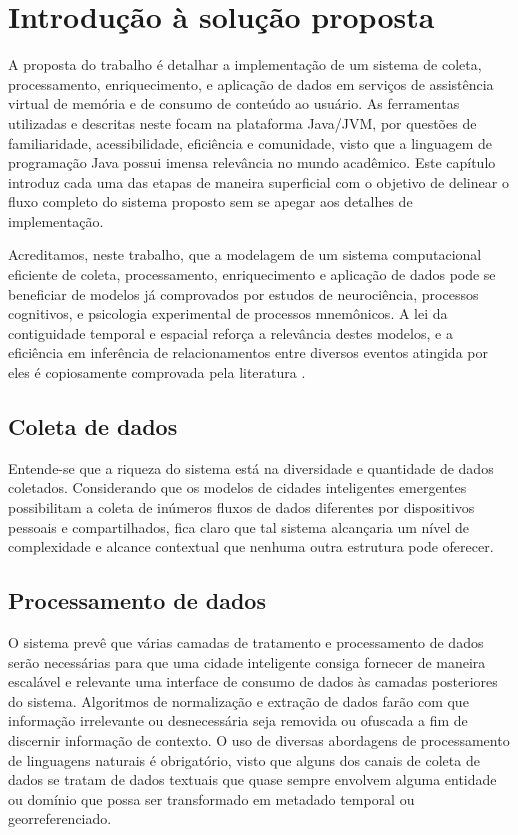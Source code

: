 \chapter{Introdução à solução proposta} \label{c:introducao_a_solucao_proposta}

A proposta do trabalho é detalhar a implementação de um sistema de coleta, processamento, enriquecimento, e aplicação de dados em serviços de assistência virtual de memória e de consumo de conteúdo ao usuário. As ferramentas utilizadas e descritas neste focam na plataforma Java/JVM, por questões de familiaridade, acessibilidade, eficiência e comunidade, visto que a linguagem de programação Java possui imensa relevância no mundo acadêmico. Este capítulo introduz cada uma das etapas de maneira superficial com o objetivo de delinear o fluxo completo do sistema proposto sem se apegar aos detalhes de implementação.

Acreditamos, neste trabalho, que a modelagem de um sistema computacional eficiente de coleta, processamento, enriquecimento e aplicação de dados pode se beneficiar de modelos já comprovados por estudos de neurociência, processos cognitivos, e psicologia experimental de processos mnemônicos. A lei da contiguidade temporal e espacial reforça a relevância destes modelos, e a eficiência em inferência de relacionamentos entre diversos eventos atingida por eles é copiosamente comprovada pela literatura \cite{Polyn2011SemanticCA}.

\section{Coleta de dados} \label{s:coleta_de_dados}

Entende-se que a riqueza do sistema está na diversidade e quantidade de dados coletados. Considerando que os modelos de cidades inteligentes emergentes possibilitam a coleta de inúmeros fluxos de dados diferentes por dispositivos pessoais e compartilhados, fica claro que tal sistema alcançaria um nível de complexidade e alcance contextual que nenhuma outra estrutura pode oferecer. 

\section{Processamento de dados} \label{s:processamento_de_dados}

O sistema prevê que várias camadas de tratamento e processamento de dados serão necessárias para que uma cidade inteligente consiga fornecer de maneira escalável e relevante uma interface de consumo de dados às camadas posteriores do sistema. Algoritmos de normalização e extração de dados farão com que informação irrelevante ou desnecessária seja removida ou ofuscada a fim de discernir informação de contexto. O uso de diversas abordagens de processamento de linguagens naturais é obrigatório, visto que alguns dos canais de coleta de dados se tratam de dados textuais que quase sempre envolvem alguma entidade ou domínio que possa ser transformado em metadado temporal ou georreferenciado.

